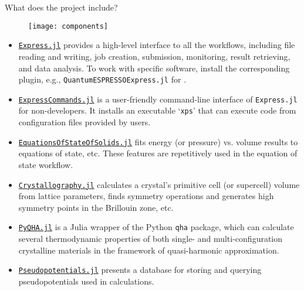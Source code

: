 \begin{frame}[allowframebreaks]{What does the \express{} project include?}
    \begin{figure}
        \centering
        \texttt{[image: components]}
        \label{fig:components}
    \end{figure}

    \begin{itemize}
        \item \href{https://github.com/MineralsCloud/Express.jl}{\texttt{Express.jl}}
              provides a high-level interface to all the
              workflows, including file reading and writing, job
              creation, submission, monitoring, result retrieving, and data
              analysis. To work with specific software, install the corresponding plugin,
              e.g., \texttt{QuantumESPRESSOExpress.jl} for \qe.
        \item \href{https://github.com/MineralsCloud/ExpressCommands.jl}{\texttt{ExpressCommands.jl}}
              is a user-friendly command-line interface of
              \texttt{Express.jl} for non-developers. It installs an executable
              `\texttt{xps}' that can execute code from configuration files provided by users.
        \item \href{https://github.com/MineralsCloud/EquationsOfStateOfSolids.jl}{\texttt{EquationsOfStateOfSolids.jl}}
              fits energy (or pressure) vs. volume results to equations of state,
              etc. These features are repetitively used in the equation of state workflow.
        \item \href{https://github.com/MineralsCloud/Crystallography.jl}{\texttt{Crystallography.jl}}
              calculates a crystal's primitive cell (or supercell) volume from lattice parameters, finds symmetry
              operations and generates high symmetry points in the Brillouin zone, etc.
        \item \href{https://github.com/MineralsCloud/PyQHA.jl}{\texttt{PyQHA.jl}}
              is a Julia wrapper of
              the Python \texttt{qha} package, which can calculate
              several thermodynamic properties of both single- and multi-configuration
              crystalline materials in the framework of quasi-harmonic approximation.
        \item \href{https://github.com/MineralsCloud/Pseudopotentials.jl}{\texttt{Pseudopotentials.jl}} presents
              a database for storing and querying pseudopotentials used in \ab{} calculations.

\end{itemize}
\end{frame}
